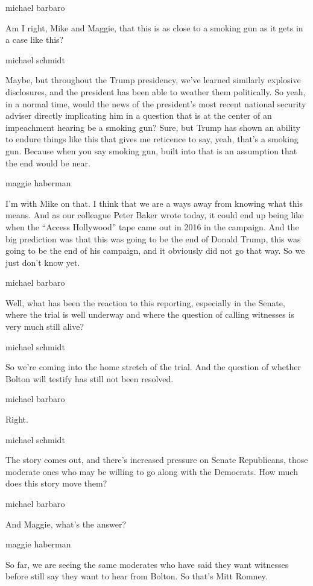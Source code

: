 michael barbaro

Am I right, Mike and Maggie, that this is as close to a smoking gun as
it gets in a case like this?

michael schmidt

Maybe, but throughout the Trump presidency, we've learned similarly
explosive disclosures, and the president has been able to weather them
politically. So yeah, in a normal time, would the news of the
president's most recent national security adviser directly implicating
him in a question that is at the center of an impeachment hearing be a
smoking gun? Sure, but Trump has shown an ability to endure things like
this that gives me reticence to say, yeah, that's a smoking gun. Because
when you say smoking gun, built into that is an assumption that the end
would be near.

maggie haberman

I'm with Mike on that. I think that we are a ways away from knowing what
this means. And as our colleague Peter Baker wrote today, it could end
up being like when the ``Access Hollywood'' tape came out in 2016 in the
campaign. And the big prediction was that this was going to be the end
of Donald Trump, this was going to be the end of his campaign, and it
obviously did not go that way. So we just don't know yet.

michael barbaro

Well, what has been the reaction to this reporting, especially in the
Senate, where the trial is well underway and where the question of
calling witnesses is very much still alive?

michael schmidt

So we're coming into the home stretch of the trial. And the question of
whether Bolton will testify has still not been resolved.

michael barbaro

Right.

michael schmidt

The story comes out, and there's increased pressure on Senate
Republicans, those moderate ones who may be willing to go along with the
Democrats. How much does this story move them?

michael barbaro

And Maggie, what's the answer?

maggie haberman

So far, we are seeing the same moderates who have said they want
witnesses before still say they want to hear from Bolton. So that's Mitt
Romney.

